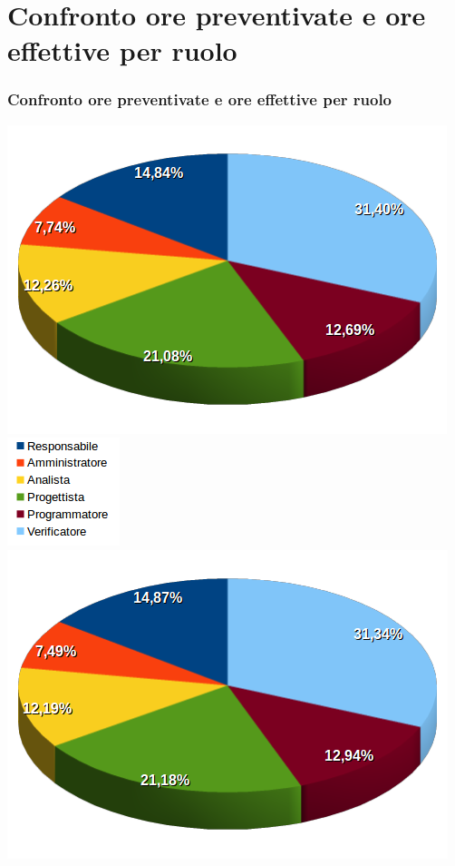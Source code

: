 \section{Confronto ore preventivate e ore effettive per ruolo}
\begin{frame}
	\frametitle{Confronto ore preventivate e ore effettive per ruolo}	
\begin{center}
	\includegraphics[scale=0.23]{img/orePREVENTIVATEperruolo.png}
	\qquad
	\includegraphics[scale=0.43]{img/legenda.png}
	\qquad
	\includegraphics[scale=0.23]{img/oreEFFETTIVEperruolo.png}

\end{center}
	
	
\end{frame}

